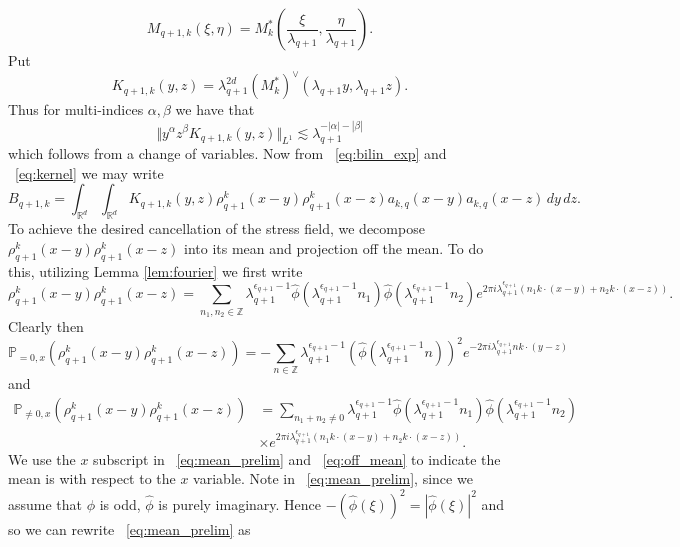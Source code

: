 \documentclass[12pt,reqno,letterpaper]{amsart}
\numberwithin{equation}{section}
\newcommand{\1}{{\bf 1}}
\newcommand{\2}{{\bf 2}}
\newcommand{\R}{\mathbb R}
\newcommand{\Z}{\mathbb Z}
\theoremstyle{remark}
\theoremstyle{remark}
\begin{document}
$$
M_{q+1,k}(\xi,\eta) = M_k^*\left(\frac{\xi}{\lambda_{q+1}},\frac{\eta}{\lambda_{q+1}}\right).
$$
Put
\begin{equation}\label{eq:kernel}
    K_{q+1,k}(y,z) = \lambda_{q+1}^{2d} \left(M_k^*\right)^{\vee}(\lambda_{q+1}y,\lambda_{q+1}z).
\end{equation}
Thus for multi-indices $\alpha,\beta$ we have that
\begin{equation}\label{eq:kernel_est}
    \Vert y^\alpha z^\beta K_{q+1,k}(y,z) \Vert_{L^1} \lesssim \lambda_{q+1}^{-|\alpha|-|\beta|}
\end{equation}
which follows from a change of variables. Now from ~\eqref{eq:bilin_exp} and ~\eqref{eq:kernel} we may write
\begin{equation}\label{eq:conv_exp}
    B_{q+1,k} = \int_{\R^d} \int_{\R^d} K_{q+1,k}(y,z) \rho_{q+1}^k(x-y) \rho_{q+1}^k(x-z) a_{k,q}(x-y) a_{k,q}(x-z)\, dy\, dz.
\end{equation}
To achieve the desired cancellation of the stress field, we decompose $\rho_{q+1}^k(x-y) \rho_{q+1}^k(x-z)$ into its mean and projection off the mean. To do this, utilizing Lemma \ref{lem:fourier} we first write
$$
\rho_{q+1}^k(x-y) \rho_{q+1}^k(x-z) = \sum_{n_1,n_2 \in \Z} \lambda_{q+1}^{\epsilon_{q+1}-1} \hat{\phi}\left(\lambda_{q+1}^{\epsilon_{q+1}-1}n_1\right) \hat{\phi}\left(\lambda_{q+1}^{\epsilon_{q+1}-1}n_2\right) e^{2\pi i \lambda_{q+1}^{\epsilon_{q+1}} \left(n_1k \cdot (x-y) + n_2k \cdot (x-z)\right)}.
$$
Clearly then
\begin{equation}\label{eq:mean_prelim}
    \mathbb{P}_{=0,x}\left(\rho_{q+1}^k(x-y) \rho_{q+1}^k(x-z)\right) = - \sum_{n \in \Z} \lambda_{q+1}^{\epsilon_{q+1}-1} \left(\hat{\phi}\left(\lambda_{q+1}^{\epsilon_{q+1}-1}n\right)\right)^2 e^{-2\pi i \lambda_{q+1}^{\epsilon_{q+1}} n k \cdot (y-z)}
\end{equation}
and
\begin{equation}\label{eq:off_mean}
\begin{split}
    \mathbb{P}_{\not=0,x}\left(\rho_{q+1}^k(x-y) \rho_{q+1}^k(x-z)\right) &= \sum_{n_1+n_2 \not = 0} \lambda_{q+1}^{\epsilon_{q+1}-1} \hat{\phi}\left(\lambda_{q+1}^{\epsilon_{q+1}-1}n_1\right) \hat{\phi}\left(\lambda_{q+1}^{\epsilon_{q+1}-1}n_2\right)\\
    &\times e^{2\pi i \lambda_{q+1}^{\epsilon_{q+1}} \left(n_1k \cdot (x-y) + n_2k \cdot (x-z)\right)}.
    \end{split}
\end{equation}
We use the $x$ subscript in ~\eqref{eq:mean_prelim} and ~\eqref{eq:off_mean} to indicate the mean is with respect to the $x$ variable. Note in ~\eqref{eq:mean_prelim}, since we assume that $\phi$ is odd, $\hat{\phi}$ is purely imaginary. Hence $-(\hat{\phi}(\xi))^2 = |\hat{\phi}(\xi)|^2$ and so we can rewrite ~\eqref{eq:mean_prelim} as
\end{document}
